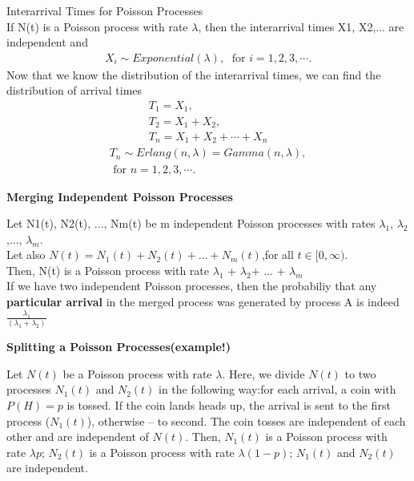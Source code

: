 Interarrival Times for Poisson Processes\\

If N(t) is a Poisson process with rate $\lambda$, then the interarrival times X1, X2,...  are independent and
\begin{align*}
  X_i \sim Exponential(\lambda), \; \textrm{ for }i=1,2,3, \cdots.
\end{align*}
Now that we know the distribution of the interarrival times, we can find the distribution of arrival times \\

\begin{align*}
  T_1=X_1,\\
  T_2=X_1+X_2,\\
  T_n=X_1+X_2+\cdots+X_n 
\end{align*}
\begin{align*}
  T_n \sim Erlang(n,\lambda)=Gamma(n, \lambda), \\ 
  \textrm{ for }n=1,2,3, \cdots.
\end{align*}

\textbf{Merging Independent Poisson Processes}

Let N1(t), N2(t), ..., Nm(t) be m independent Poisson processes with rates $\lambda_1$, $\lambda_2$,..., $\lambda_m$.\\ 
Let also $N(t)=N_{1}(t)+N_{2}(t)+...+N_{m}(t)$,for all $t\in [0,\infty)$.\\
Then, N(t) is a Poisson process with rate $\lambda_1$ + $\lambda_2$+ ... + $\lambda_m$ \\

If we have two independent Poisson processes, then the probabiliy that any \textbf{particular arrival} in the merged process was generated by process A is indeed $\frac{\lambda_1}{(\lambda_1+\lambda_2)}$

\textbf{Splitting a Poisson Processes(example!)}

Let $N(t)$ be a Poisson process with rate $\lambda$. Here, we divide $N(t)$ to two processes $N_{1}(t)$ and $N_{2}(t)$ in the following way:for each arrival, a coin with $P(H)=p$ is tossed. If the coin lands heads up, the arrival is sent to the first process ($N_{1}(t)$), otherwise -- to second. The coin tosses are independent of each other and are independent of $N(t)$. Then,
$N_{1}(t)$  is a Poisson process with rate $\lambda p$;
$N_{2}(t)$  is a Poisson process with rate  $\lambda (1 - p)$;
$N_{1}(t)$ and $N_{2}(t)$ are independent.



